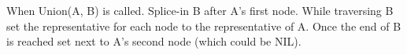When Union(A, B) is called. Splice-in B after A's first node.
While traversing B set the representative for each node to the
representative of A. Once the end of B is reached set next to A's
second node (which could be NIL).
